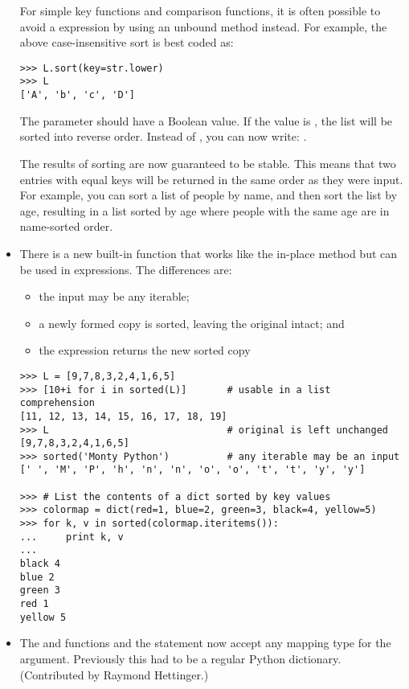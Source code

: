 \documentclass{howto}
\begin{document}
\begin{itemize}
For simple key functions and comparison functions, it is often
possible to avoid a  expression by using an unbound
method instead.  For example, the above case-insensitive sort is best
coded as:

\begin{verbatim}
>>> L.sort(key=str.lower)
>>> L
['A', 'b', 'c', 'D']
\end{verbatim}       

The  parameter should have a Boolean value.  If the value
is , the list will be sorted into reverse order.
Instead of , you can now write: .

The results of sorting are now guaranteed to be stable.  This means
that two entries with equal keys will be returned in the same order as
they were input.  For example, you can sort a list of people by name,
and then sort the list by age, resulting in a list sorted by age where
people with the same age are in name-sorted order.

\item There is a new built-in function
 that works like the in-place
 method but can be used in
expressions.  The differences are:
  \begin{itemize}
  \item the input may be any iterable;
  \item a newly formed copy is sorted, leaving the original intact; and
  \item the expression returns the new sorted copy
  \end{itemize}

\begin{verbatim}
>>> L = [9,7,8,3,2,4,1,6,5]
>>> [10+i for i in sorted(L)]       # usable in a list comprehension
[11, 12, 13, 14, 15, 16, 17, 18, 19]
>>> L                               # original is left unchanged
[9,7,8,3,2,4,1,6,5]
>>> sorted('Monty Python')          # any iterable may be an input
[' ', 'M', 'P', 'h', 'n', 'n', 'o', 'o', 't', 't', 'y', 'y']

>>> # List the contents of a dict sorted by key values
>>> colormap = dict(red=1, blue=2, green=3, black=4, yellow=5)
>>> for k, v in sorted(colormap.iteritems()):
...     print k, v
...
black 4
blue 2
green 3
red 1
yellow 5
\end{verbatim}

\item The 
and 
functions and the  statement now accept any mapping type
for the  argument.  Previously this had to be a regular
Python dictionary.  (Contributed by Raymond Hettinger.)


\end{itemize}
\end{document}
